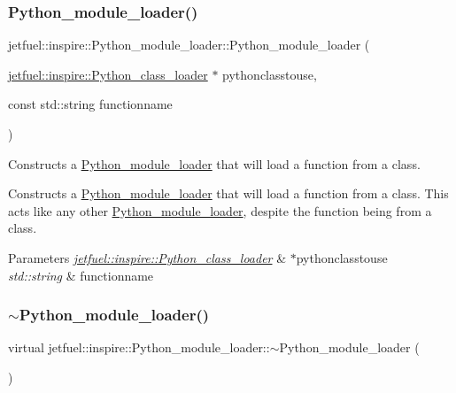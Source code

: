 \subsubsection{\texorpdfstring{Python\+\_\+module\+\_\+loader()}{Python\_module\_loader()}\hspace{0.1cm}{\footnotesize\ttfamily [2/2]}}
{\footnotesize\ttfamily jetfuel\+::inspire\+::\+Python\+\_\+module\+\_\+loader\+::\+Python\+\_\+module\+\_\+loader (\begin{DoxyParamCaption}\item[{\hyperlink{classjetfuel_1_1inspire_1_1Python__class__loader}{jetfuel\+::inspire\+::\+Python\+\_\+class\+\_\+loader} $\ast$}]{pythonclasstouse,  }\item[{const std\+::string}]{functionname }\end{DoxyParamCaption})}



Constructs a \hyperlink{classjetfuel_1_1inspire_1_1Python__module__loader}{Python\+\_\+module\+\_\+loader} that will load a function from a class. 

Constructs a \hyperlink{classjetfuel_1_1inspire_1_1Python__module__loader}{Python\+\_\+module\+\_\+loader} that will load a function from a class. This acts like any other \hyperlink{classjetfuel_1_1inspire_1_1Python__module__loader}{Python\+\_\+module\+\_\+loader}, despite the function being from a class.


\begin{DoxyParams}{Parameters}
{\em \hyperlink{classjetfuel_1_1inspire_1_1Python__class__loader}{jetfuel\+::inspire\+::\+Python\+\_\+class\+\_\+loader}} & $\ast$pythonclasstouse \\
\hline
{\em std\+::string} & functionname \\
\hline
\end{DoxyParams}
\mbox{\label{classjetfuel_1_1inspire_1_1Python__module__loader_a87c6c13c50ca78e59e19d291355a8bc5}} 
\subsubsection{\texorpdfstring{$\sim$\+Python\+\_\+module\+\_\+loader()}{~Python\_module\_loader()}}
{\footnotesize\ttfamily virtual jetfuel\+::inspire\+::\+Python\+\_\+module\+\_\+loader\+::$\sim$\+Python\+\_\+module\+\_\+loader (\begin{DoxyParamCaption}{ }\end{DoxyParamCaption})\hspace{0.3cm}{\ttfamily [virtual]}}



